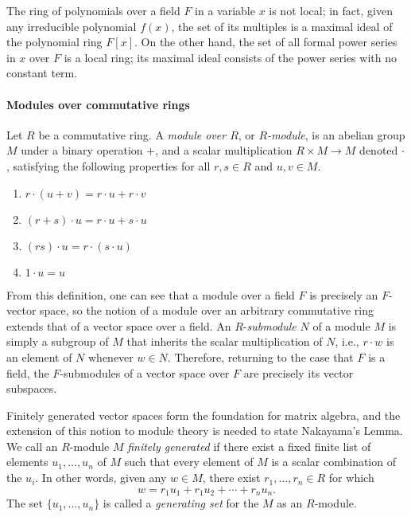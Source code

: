 \documentclass{article}
\begin{document}
The ring of polynomials over a field $F$ in a variable $x$ is not local; in
fact, given any irreducible polynomial $f(x)$, the set of its multiples is a
maximal ideal of the polynomial ring $F[x]$. On the other hand, the set of all
formal power series  in $x$ over $F$ is a local ring; its maximal ideal
consists of the power series with no constant term. 


\paragraph{Modules over commutative rings}
Let  $R$ be a commutative ring. 
A \emph{module over $R$}, or \emph{$R$-module}, is an abelian group $M$ under a
binary operation $+$, and a {scalar multiplication} $R \times M \to M$ denoted
$\cdot$, satisfying the following properties for all $r, s \in R$
and $u, v \in M$.

\begin{enumerate}[leftmargin=5cm,topsep=0cm,itemsep=0cm]
  \item  $r \cdot (u + v)  = r \cdot u + r \cdot v$
  \item $(r+s) \cdot u = r \cdot u + s \cdot u$
  \item $(rs) \cdot u = r \cdot (s \cdot u)$
  \item $1 \cdot u = u$ 
\end{enumerate}

From this definition, one can see that a module over a field $F$ is precisely
an $F$-vector space, so the notion of a module over an arbitrary commutative
ring extends that of a vector space over a field. 
An $R$-\emph{submodule} $N$ of a module $M$ is simply a subgroup of $M$ that inherits 
the scalar multiplication of $N$, i.e., $r \cdot w$ is an element of $N$ whenever $w \in N$.
Therefore, returning to the case that $F$ is a field,
the $F$-submodules of a vector space over $F$ are precisely its vector subspaces. 


Finitely generated vector spaces form the foundation for matrix algebra, and the extension of this notion
to module theory is needed to state Nakayama's Lemma. We call an $R$-module
$M$ \emph{finitely generated} if there exist a fixed finite list of elements
$u_1, \ldots, u_n$ of $M$ such that every element of $M$ is a scalar combination 
of the $u_i$.  In other words, 
given any  $w \in M$,
there exist $r_1, \ldots, r_n \in R$ for which  
\[w = r_1 u_1 + r_1 u_2 + \cdots + r_n u_n\text{.}\]
The set $\{u_1, \ldots, u_n\}$ is called a \emph{generating set} for the $M$ as
an $R$-module. 
\end{document}

